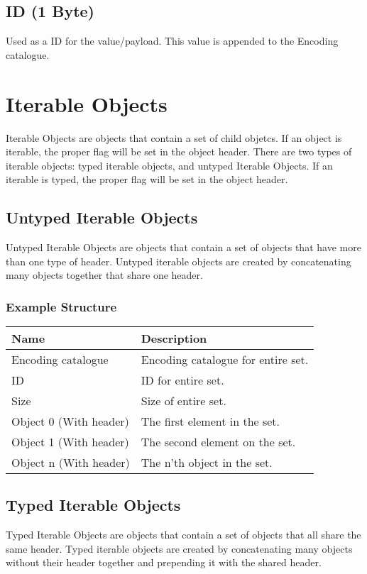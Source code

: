 \documentclass[11pt]{article}
\begin{document}
\subsection{ID (1 Byte)}
Used as a ID for the value/payload. This value is appended to the Encoding catalogue.

\section{Iterable Objects}
Iterable Objects are objects that contain a set of child objetcs. If an object is iterable, the proper flag will be set in the object header. There are two types of iterable objects: typed iterable objects, and untyped Iterable Objects. If an iterable is typed, the proper flag will be set in the object header.

\subsection{Untyped Iterable Objects}
Untyped Iterable Objects are objects that contain a set of objects that have more than one type of header. Untyped iterable objects are created by concatenating many objects together that share one header.

\subsubsection{Example Structure}

\begin{center}
\begin{tabular}{ |l|l| } 
\hline
\textbf{Name} & \textbf{Description}\\
\hline
Encoding catalogue & Encoding catalogue for entire set. \\  
ID & ID for entire set. \\  
Size & Size of entire set. \\  
Object 0 (With header) & The first element in the set. \\ 
Object 1 (With header) & The second element on the set. \\ 
Object n (With header) & The n'th object in the set. \\ 
\hline
\end{tabular}
\end{center}

\subsection{Typed Iterable Objects}
Typed Iterable Objects are objects that contain a set of objects that all share the same header. Typed iterable objects are created by concatenating many objects without their header together and prepending it with the shared header. 
\end{document}
